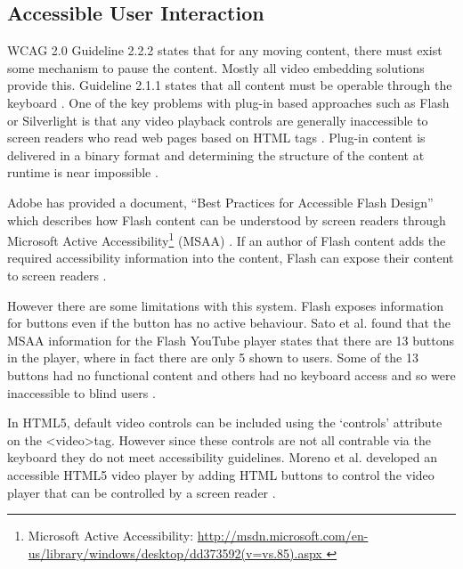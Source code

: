 \documentclass[journal]{IEEEtran}
\begin{document}
\subsection{Accessible User Interaction}
WCAG 2.0 Guideline 2.2.2 states that for any moving content, there must exist some mechanism to pause the content. Mostly all video embedding solutions provide this. Guideline 2.1.1 states that all content must be operable through the keyboard \cite{standard:wcag2}. One of the key problems with plug-in based approaches such as Flash or Silverlight is that any video playback controls are generally inaccessible to screen readers who read web pages based on HTML tags \cite{inproceedings:transformingFlashToXML}\cite{incollection:accessibilityEvaluationForMultimediaContent}. Plug-in content is delivered in a binary format and determining the structure of the content at runtime is near impossible \cite{inproceedings:transformingFlashToXML}.

Adobe has provided a document, ``Best Practices for Accessible Flash Design'' which describes how Flash content can be understood by screen readers through Microsoft Active Accessibility\footnote{Microsoft Active Accessibility: \url{http://msdn.microsoft.com/en-us/library/windows/desktop/dd373592(v=vs.85).aspx
}} (MSAA) \cite{whitePaper:bestPracticesForAccessibleFlashDesign}. If an author of Flash content adds the required accessibility information into the content, Flash can expose their content to screen readers \cite{inproceedings:automaticAccesibilityTranscodingForFlashContent}.

However there are some limitations with this system. Flash exposes information for buttons even if the button has no active behaviour. Sato et al. found that the MSAA information for the Flash YouTube player states that there are 13 buttons in the player, where in fact there are only 5 shown to users. Some of the 13 buttons had no functional content and others had no keyboard access and so were inaccessible to blind users \cite{inproceedings:automaticAccesibilityTranscodingForFlashContent}.


In HTML5, default video controls can be included using the `controls' attribute on the \textless video\textgreater tag. However since these controls are not all contrable via the keyboard %
they do not meet accessibility guidelines. Moreno et al. developed an accessible HTML5 video player by adding HTML buttons to control the video player that can be controlled by a screen reader \cite{incollection:html5SupportForAnAccessibleWeb}.
\end{document}
